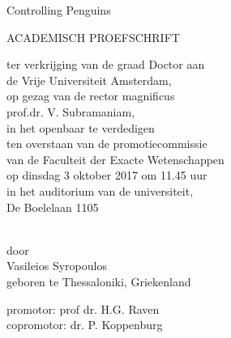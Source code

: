\begin{titlepage}
\begin{center}
	Controlling Penguins

	\vspace{2cm}

	ACADEMISCH PROEFSCHRIFT

	\vspace{0.5cm}

\begin{minipage}{0.65\textwidth}
\centering
ter verkrijging van de graad Doctor aan\\
de Vrije Universiteit Amsterdam,\\
op gezag van de rector magnificus\\
prof.dr. V. Subramaniam,\\
in het openbaar te verdedigen\\
ten overstaan van de promotiecommissie\\
van de Faculteit der Exacte Wetenschappen\\
op dinsdag 3 oktober 2017 om 11.45 uur\\
in het auditorium van de universiteit,\\
De Boelelaan 1105
\end{minipage}\\[3cm]

door\\
\vspace{0.5cm}
Vasileios Syropoulos\\
\vspace{0.5cm}
geboren te Thessaloniki, Griekenland

\end{center}

\clearpage

\begin{flushleft}
promotor: prof dr. H.G. Raven\\
copromotor: dr. P. Koppenburg
\end{flushleft}

\vfill






\end{titlepage}
